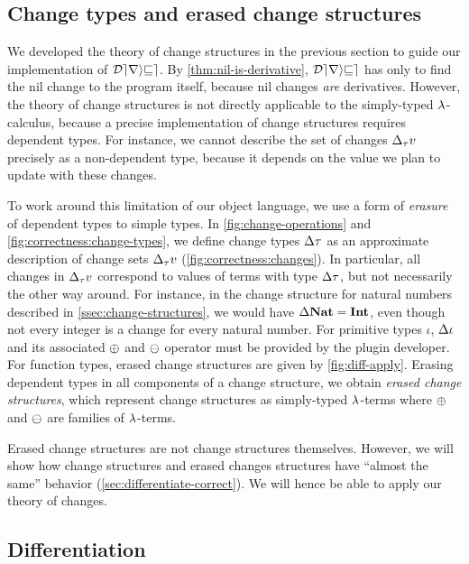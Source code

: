 \subsection{Change types and erased change structures}
\label{ssec:change-types}




We developed the theory of change structures in the previous
section to guide our implementation of $\mathcal{Derive}$. By
\cref{thm:nil-is-derivative}, $\mathcal{Derive}$ has only to find the nil
change to the program itself, because nil changes \emph{are}
derivatives. However, the theory of change structures is not
directly applicable to the simply-typed $\lambda$-calculus, 
because a precise implementation of
change structures requires dependent types. For instance,  
we cannot describe the set of
changes $\Change[\Gt]{v}$ precisely as a non-dependent type, because it depends on the value we plan
to update with these changes. 




To work around this limitation of
our object language, we use a form of \emph{erasure} of dependent types
to simple types. In \cref{fig:change-operations} and \cref{fig:correctness:change-types}, we
define change types $\Change{\Gt}$ as an approximate description
of change sets $\Change[\Gt]{v}$ (\cref{fig:correctness:changes}). 
In particular, all changes in $\Change[\Gt]{v}$ correspond to values of terms with type $\Change{\Gt}$,
but not necessarily the other way around. 
For instance, in the
change structure for natural numbers described in \cref{ssec:change-structures}, we would
have $\Change{\Nat} = \Int$, even though not every
integer is a change for every natural number.
For primitive types $\iota$, 
$\Change{\iota}$ and its associated $\UPDATE$ and $\DIFF$ operator
must be provided by the plugin developer.
For function types, erased change structures are given by \cref{fig:diff-apply}.
%
Erasing dependent types in all components of a change structure,
we obtain \emph{erased change structures}, which represent change
structures as simply-typed $\lambda$-terms
where $\UPDATE$ and $\DIFF$ are
families of $\lambda$-terms. 

Erased change structures are not change structures themselves.
However, we will show how change structures and erased changes
structures have ``almost the same'' behavior
(\cref{sec:differentiate-correct}). We will hence be able to
apply our theory of changes.

\subsection{Differentiation}
\label{ssec:differentiation}

